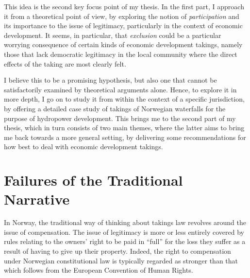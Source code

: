 This idea is the second key focus point of my thesis. In the first part, I approach it from a theoretical point of view, by exploring the notion of {\it participation} and its importance to the issue of legitimacy, particularly in the context of economic development. It seems, in particular, that {\it exclusion} could be a particular worrying consequence of certain kinds of economic development takings, namely those that lack democratic legitimacy in the local community where the direct effects of the taking are most clearly felt.

I believe this to be a promising hypothesis, but also one that cannot be satisfactorily examined by theoretical arguments alone. Hence, to explore it in more depth, I go on to study it from within the context of a specific jurisdiction, by offering a detailed case study of takings of Norwegian waterfalls for the purpose of hydropower development. This brings me to the second part of my thesis, which in turn consists of two main themes, where the latter aims to bring me back towards a more general setting, by delivering some recommendations for how best to deal with economic development takings.



\section{Failures of the Traditional Narrative}

In Norway, the traditional way of thinking about takings law revolves around the issue of compensation. The issue of legitimacy is more or less entirely covered by rules relating to the owners' right to be paid in ``full'' for the loss they suffer as a result of having to give up their property. Indeed, the right to compensation under Norwegian constitutional law is typically regarded as stronger than that which follows from the European Convention of Human Rights. 

